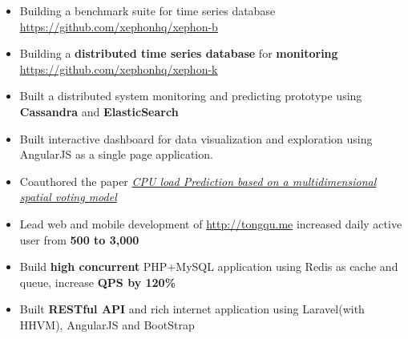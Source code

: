 \documentclass[10pt, letterpaper]{simple-cv}
\begin{document}
\begin{itemize}
\item Building a benchmark suite for time series database \url{https://github.com/xephonhq/xephon-b}
\item Building a \textbf{distributed time series database} for \textbf{monitoring} \url{https://github.com/xephonhq/xephon-k}
\end{itemize}

\begin{itemize}
\item Built a distributed system monitoring and predicting prototype using \textbf{Cassandra} and \textbf{ElasticSearch}
\item Built interactive dashboard for data visualization and exploration using AngularJS as a single page application.
\item Coauthored the paper \textit{\href{https://at15.github.io/pub/cpu_load_prediction.pdf}{CPU load Prediction based on a multidimensional spatial voting model}}
\end{itemize}

\begin{itemize}
\item Lead web and mobile development of \url{http://tongqu.me} increased daily active user from \textbf{500 to 3,000}
\item Build \textbf{high concurrent} PHP+MySQL application using Redis as cache and queue, increase \textbf{QPS by 120\%}
\item Built \textbf{RESTful API} and rich internet application using Laravel(with HHVM), AngularJS and BootStrap
\end{itemize}
\end{document}
